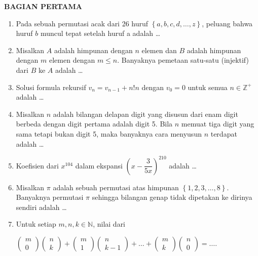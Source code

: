 \documentclass[12pt,twoside]{article}
\begin{document}
\textbf{BAGIAN PERTAMA}
\begin{enumerate}
	\item Pada sebuah permutasi acak dari 26 huruf $\left\lbrace a,b,c,d,\dots,z \right\rbrace$, peluang bahwa huruf $b$ muncul tepat setelah huruf a adalah \dots

	\item Misalkan $A$ adalah himpunan dengan $n$ elemen dan $B$ adalah himpunan dengan $m$ elemen dengan $m \leq n$. Banyaknya pemetaan satu-satu (injektif) dari $B$ ke $A$ adalah \dots

	\item Solusi formula rekursif $v_n = v_{n-1} + n!n$ dengan $v_0 = 0$ untuk semua $n \in \mathbb{Z}^+$ adalah \dots

	\item Misalkan $n$ adalah bilangan delapan digit yang disusun dari enam digit berbeda dengan digit pertama adalah digit 5. Bila $n$ memuat tiga digit yang sama tetapi bukan digit 5, maka banyaknya cara menyusun $n$ terdapat adalah \dots

	\item Koefisien dari $x^{104}$ dalam ekspansi $\left( x - \dfrac{3}{5x} \right)^{210}$ adalah \dots

	\item Misalkan $\pi$ adalah sebuah permutasi atas himpunan $\left\lbrace 1,2,3,\dots,8 \right\rbrace$. Banyaknya permutasi $\pi$ sehingga bilangan genap tidak dipetakan ke dirinya sendiri adalah \dots

	\item Untuk setiap $m,n,k \in \mathbb{N}$, nilai dari
	      \begin{center}
		      $
			      \left( \begin{array}{c}
				      m \\0
			      \end{array} \right)
			      \left( \begin{array}{c}
				      n \\k
			      \end{array} \right) +
			      \left( \begin{array}{c}
				      m \\1
			      \end{array} \right)
			      \left( \begin{array}{c}
				      n \\k-1
			      \end{array} \right)+\dots +
			      \left( \begin{array}{c}
				      m \\k
			      \end{array} \right)
			      \left( \begin{array}{c}
				      n \\0
			      \end{array} \right) =\dots.
		      $
	      \end{center}


\end{enumerate}
\end{document}
